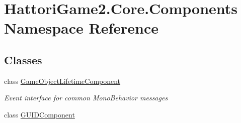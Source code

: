 \hypertarget{namespace_hattori_game2_1_1_core_1_1_components}{}\section{Hattori\+Game2.\+Core.\+Components Namespace Reference}
\label{namespace_hattori_game2_1_1_core_1_1_components}
\subsection*{Classes}
\begin{DoxyCompactItemize}
\item 
class \hyperlink{class_hattori_game2_1_1_core_1_1_components_1_1_game_object_lifetime_component}{Game\+Object\+Lifetime\+Component}
\begin{DoxyCompactList}\small\item\em Event interface for common Mono\+Behavior messages \end{DoxyCompactList}\item 
class \hyperlink{class_hattori_game2_1_1_core_1_1_components_1_1_g_u_i_d_component}{G\+U\+I\+D\+Component}
\end{DoxyCompactItemize}
